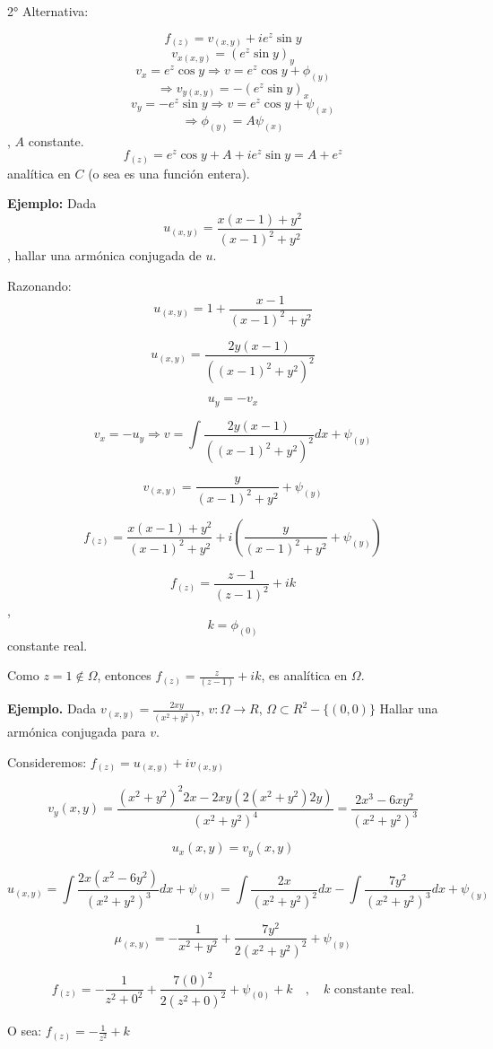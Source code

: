 \documentclass[a4paper,12pt]{article}
\begin{document}
2° Alternativa:

$$f_{(z)} = v_{(x,y)} + ie^z \sin y$$
$$v_{x(x,y)} = (e^z \sin y)_y$$ $$v_x = e^z \cos y \Rightarrow v = e^z \cos y + \phi_{(y)}$$
$$\Rightarrow v_{y(x,y)} = -(e^z \sin y)_x$$ $$v_y = -e^z \sin y \Rightarrow v = e^z \cos y + \psi_{(x)}$$
$$\Rightarrow \phi_{(y)} = A \psi_{(x)}$$, $A$ constante.
$$f_{(z)} = e^z \cos y + A + ie^z \sin y = A + e^z$$ analítica en $C$ (o sea es una función entera).

\textbf{Ejemplo:} Dada $$u_{(x,y)} = \frac{x(x-1) + y^2}{(x-1)^2 + y^2}$$, hallar una armónica conjugada de $u$.

Razonando: $$u_{(x,y)} = 1 + \frac{x-1}{(x-1)^2 + y^2}$$

$$u_{(x,y)} = \frac{2 y (x-1)}{((x-1)^2 + y^2)^2}$$

$$u_{y} = -v_x$$

$$v_x = -u_y \Rightarrow v = \int \frac{2 y (x-1)}{((x-1)^2 + y^2)^2} dx + \psi_{(y)}$$

$$v_{(x,y)} = \frac{y}{(x-1)^2 + y^2} + \psi_{(y)}$$

$$f_{(z)} = \frac{x(x-1) + y^2}{(x-1)^2 + y^2} + i \left( \frac{y}{(x-1)^2 + y^2} + \psi_{(y)} \right)$$

$$f_{(z)} = \frac{z-1}{(z-1)^2} + ik$$, $$k = \phi_{(0)}$$ constante real.

Como $z=1 \notin \Omega$, entonces $f_{(z)} = \frac{z}{(z-1)} + ik$, es analítica en $\Omega$.


\textbf{Ejemplo.} Dada \( v_{(x,y)} = \frac{2xy}{(x^2 + y^2)^2} \), \( v : \Omega \rightarrow R \), \( \Omega \subset R^2 - \{(0,0)\} \) Hallar una armónica conjugada para \( v \).

Consideremos: \( f_{(z)} = u_{(x,y)} + iv_{(x,y)} \)

\[ v_y(x,y) = \frac{(x^2 + y^2)^2 2x - 2xy(2(x^2 + y^2)2y)}{(x^2 + y^2)^4} = \frac{2x^3 - 6xy^2}{(x^2 + y^2)^3} \]

\[ u_x(x,y) = v_y(x,y) \]

\[ u_{(x,y)} = \int \frac{2x(x^2 - 6y^2)}{(x^2 + y^2)^3} dx + \psi_{(y)} = \int \frac{2x}{(x^2 + y^2)^2} dx - \int \frac{7y^2}{(x^2 + y^2)^3} dx + \psi_{(y)} \]

\[ \mu_{(x,y)} = -\frac{1}{x^2 + y^2} + \frac{7y^2}{2(x^2 + y^2)^2} + \psi_{(y)} \]

\[ f_{(z)} = -\frac{1}{z^2 + 0^2} + \frac{7(0)^2}{2(z^2 + 0)^2} + \psi_{(0)} + k \quad , \quad k \text{ constante real.} \]

O sea: \( f_{(z)} = -\frac{1}{z^2} + k \)
\end{document}
